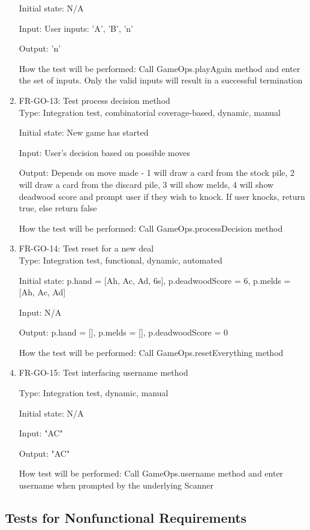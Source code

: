\documentclass[12pt, titlepage]{article}
\begin{document}
\begin{enumerate}
    Initial state: N/A
    
    Input: User inputs: 'A', 'B', 'n'
    
    Output: 'n'
    
    How the test will be performed: Call GameOps.playAgain method and enter the set of inputs. Only the valid inputs will result in a successful termination
    
    \item{FR-GO-13: Test process decision method\\}
    Type: Integration test, combinatorial coverage-based, dynamic, manual
    
    Initial state: New game has started
    
    Input: User's decision based on possible moves
    
    Output: Depends on move made - 1 will draw a card from the stock pile, 2 will draw a card from the discard pile, 3 will show melds, 4 will show deadwood score and prompt user if they wish to knock. If user knocks, return true, else return false
    
    How the test will be performed: Call GameOps.processDecision method
    
    \item{FR-GO-14: Test reset for a new deal\\}
    Type: Integration test, functional, dynamic, automated
    
    Initial state: p.hand = [Ah, Ac, Ad, 6s], p.deadwoodScore = 6, p.melds = [Ah, Ac, Ad]
    
    Input: N/A
    
    Output: p.hand = [], p.melds = [], p.deadwoodScore = 0
    
    How the test will be performed: Call GameOps.resetEverything method
    
    \item{FR-GO-15: Test interfacing username method\\}
    
    Type: Integration test, dynamic, manual
    
    Initial state: N/A
    
    Input: "AC"
    
    Output: "AC"
    
    How test will be performed: Call GameOps.username method and enter username when prompted by the underlying Scanner
\end{enumerate}

\subsection{Tests for Nonfunctional Requirements}
\end{document}
